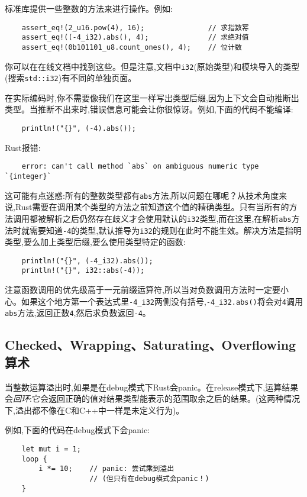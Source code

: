 标准库提供一些整数的方法来进行操作。例如:
\begin{verbatim}
    assert_eq!(2_u16.pow(4), 16);               // 求指数幂
    assert_eq!((-4_i32).abs(), 4);              // 求绝对值
    assert_eq!(0b101101_u8.count_ones(), 4);    // 位计数
\end{verbatim}

你可以在在线文档中找到这些。但是注意,文档中\texttt{i32}(原始类型)和模块导入的类型(搜索\texttt{std::i32})有不同的单独页面。

在实际编码时,你不需要像我们在这里一样写出类型后缀,因为上下文会自动推断出类型。当推断不出来时,错误信息可能会让你很惊讶。例如,下面的代码不能编译:
\begin{verbatim}
    println!("{}", (-4).abs());
\end{verbatim}

Rust报错:
\begin{verbatim}
    error: can't call method `abs` on ambiguous numeric type `{integer}`
\end{verbatim}

这可能有点迷惑:所有的整数类型都有\texttt{abs}方法,所以问题在哪呢？从技术角度来说,Rust需要在调用某个类型的方法之前知道这个值的精确类型。只有当所有的方法调用都被解析之后仍然存在歧义才会使用默认的\texttt{i32}类型,而在这里,在解析\texttt{abs}方法时就需要知道\texttt{-4}的类型,默认推导为\texttt{i32}的规则在此时不能生效。解决方法是指明类型,要么加上类型后缀,要么使用类型特定的函数:
\begin{verbatim}
    println!("{}", (-4_i32).abs());
    println!("{}", i32::abs(-4));
\end{verbatim}

注意函数调用的优先级高于一元前缀运算符,所以当对负数调用方法时一定要小心。如果这个地方第一个表达式里\texttt{-4\_i32}两侧没有括号,\texttt{-4\_i32.abs()}将会对\texttt{4}调用\texttt{abs}方法,返回正数\texttt{4},然后求负数返回\texttt{-4}。

\subsection{Checked、Wrapping、Saturating、Overflowing算术}

当整数运算溢出时,如果是在debug模式下Rust会panic。在release模式下,运算结果会\emph{回环}:它会返回正确的值对结果类型能表示的范围取余之后的结果。(这两种情况下,溢出都不像在C和C++中一样是未定义行为)。

例如,下面的代码在debug模式下会panic:
\begin{verbatim}
    let mut i = 1;
    loop {
        i *= 10;    // panic: 尝试乘到溢出
                    // (但只有在debug模式会panic！)
    }
\end{verbatim}

